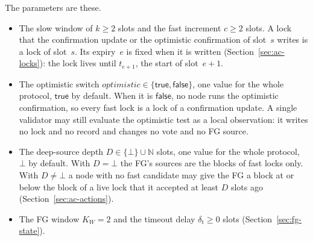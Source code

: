 \documentclass{article}
\begin{document}
The parameters are these.
\begin{itemize}
\item The slow window of $k\geq2$ slots and the fast increment $c\geq2$
  slots.  A lock that the confirmation update or the optimistic
  confirmation of slot~$s$ writes is a lock of slot~$s$.  Its expiry~$e$
  is fixed when it is written (Section~\ref{sec:ac-locks}): the lock lives
  until $t_{e+1}$, the start of slot~$e+1$.
\item The optimistic switch $\mathit{optimistic}\in\{\mathsf{true},\mathsf{false}\}$,
  one value for the whole protocol, $\mathsf{true}$ by default.  When it is
  $\mathsf{false}$, no node runs the optimistic confirmation, so every fast lock
  is a lock of a confirmation update.  A single validator may still evaluate the
  optimistic test as a local observation: it writes no lock and no record and
  changes no vote and no FG source.
\item The deep-source depth $D\in\{\bot\}\cup\mathbb N$ slots, one value for the
  whole protocol, $\bot$ by default.  With $D=\bot$ the FG's sources are the
  blocks of fast locks only.  With $D\neq\bot$ a node with no fast candidate
  may give the FG a block at or below the block of a live lock that it
  accepted at least $D$ slots ago (Section~\ref{sec:ac-actions}).
\item The FG window $K_W=2$ and the timeout delay $\delta_{\mathrm{t}}\geq0$
  slots (Section~\ref{sec:fg-state}).
\end{itemize}
\end{document}
